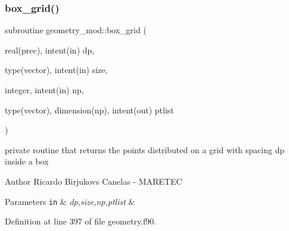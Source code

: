 \subsubsection{\texorpdfstring{box\+\_\+grid()}{box\_grid()}}
{\footnotesize\ttfamily subroutine geometry\+\_\+mod\+::box\+\_\+grid (\begin{DoxyParamCaption}\item[{real(prec), intent(in)}]{dp,  }\item[{type(vector), intent(in)}]{size,  }\item[{integer, intent(in)}]{np,  }\item[{type(vector), dimension(np), intent(out)}]{ptlist }\end{DoxyParamCaption})\hspace{0.3cm}{\ttfamily [private]}}



private routine that returns the points distributed on a grid with spacing dp inside a box 

\begin{DoxyAuthor}{Author}
Ricardo Birjukovs Canelas -\/ M\+A\+R\+E\+T\+EC 
\end{DoxyAuthor}

\begin{DoxyParams}[1]{Parameters}
\mbox{\tt in}  & {\em dp,size,np,ptlist} & \\
\hline
\end{DoxyParams}


Definition at line 397 of file geometry.\+f90.


